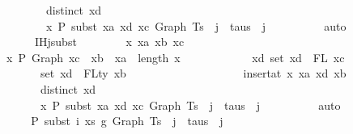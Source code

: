 \begin{isabellebody}
\ \ \ \ \ \ \ \ \ \ \ \ \ \ \ \ \ \ distinct\ xd\ {\isasymlongrightarrow}\isanewline
\ \ \ \ \ \ \ \ \ \ \ \ \ \ \ \ \ \ x\ {\isasymturnstile}{\isacharbraceleft}{\kern0pt}P{\isacharbraceright}{\kern0pt}\ subst\ xa\ xd\ xc\ {\isacharparenleft}{\kern0pt}Graph\ {\isacharparenleft}{\kern0pt}Ts\ {\isacharbang}{\kern0pt}\ j{\isacharparenright}{\kern0pt}{\isacharparenright}{\kern0pt}\ {\isacharcolon}{\kern0pt}\ taus\ {\isacharbang}{\kern0pt}\ j{\isacharparenright}{\kern0pt}{\isacharparenright}{\kern0pt}{\isachardoublequoteclose}\isanewline
\ \ \ \ \ \ \ \ \isamarkupfalse%
\ auto\isanewline
\isanewline
\ \ \ \ \ \ \isanewline
\ \ \ \ \ \ \isamarkupfalse%
\ \isamarkupfalse%
\ IHj{\isacharunderscore}{\kern0pt}subst{\isacharcolon}{\kern0pt}\isanewline
\ \ \ \ \ \ \ \ {\isachardoublequoteopen}{\isasymforall}x\ xa\ xb\ xc{\isachardot}{\kern0pt}\isanewline
\ \ \ \ \ \ \ \ \ \ \ x\ {\isasymturnstile}{\isacharbraceleft}{\kern0pt}P{\isacharbraceright}{\kern0pt}\ Graph\ xc\ {\isacharcolon}{\kern0pt}\ xb\ {\isasymlongrightarrow}\ xa\ {\isasymle}\ length\ x\ {\isasymlongrightarrow}\isanewline
\ \ \ \ \ \ \ \ \ \ \ {\isacharparenleft}{\kern0pt}{\isasymforall}xd{\isachardot}{\kern0pt}\ set\ xd\ {\isacharequal}{\kern0pt}\ FL\ xc\ {\isasymlongrightarrow}\isanewline
\ \ \ \ \ \ \ \ \ \ \ \ \ \ \ \ \ set\ xd\ {\isacharequal}{\kern0pt}\ FLty\ xb\ {\isasymlongrightarrow}\isanewline
\ \ \ \ \ \ \ \ \ \ \ \ \ \ \ \ \ {\isasymGamma}\ {\isacharequal}{\kern0pt}\ insert{\isacharunderscore}{\kern0pt}at\ x\ xa\ {\isacharparenleft}{\kern0pt}xd{\isacharcomma}{\kern0pt}\ xb{\isacharparenright}{\kern0pt}\ {\isasymlongrightarrow}\isanewline
\ \ \ \ \ \ \ \ \ \ \ \ \ \ \ \ \ distinct\ xd\ {\isasymlongrightarrow}\isanewline
\ \ \ \ \ \ \ \ \ \ \ \ \ \ \ \ \ x\ {\isasymturnstile}{\isacharbraceleft}{\kern0pt}P{\isacharbraceright}{\kern0pt}\ subst\ xa\ xd\ xc\ {\isacharparenleft}{\kern0pt}Graph\ {\isacharparenleft}{\kern0pt}Ts\ {\isacharbang}{\kern0pt}\ j{\isacharparenright}{\kern0pt}{\isacharparenright}{\kern0pt}\ {\isacharcolon}{\kern0pt}\ taus\ {\isacharbang}{\kern0pt}\ j{\isacharparenright}{\kern0pt}{\isachardoublequoteclose}\isanewline
\ \ \ \ \ \ \ \ \isamarkupfalse%
\ auto\isanewline
\isanewline
\ \ \ \ \ \ \isanewline
\ \ \ \ \ \ \isamarkupfalse%
\ {\isachardoublequoteopen}{\isasymGamma}{}\ {\isasymturnstile}{\isacharbraceleft}{\kern0pt}P{\isacharbraceright}{\kern0pt}\ subst\ i\ xs\ g{}\ {\isacharparenleft}{\kern0pt}Graph\ {\isacharparenleft}{\kern0pt}Ts\ {\isacharbang}{\kern0pt}\ j{\isacharparenright}{\kern0pt}{\isacharparenright}{\kern0pt}\ {\isacharcolon}{\kern0pt}\ taus\ {\isacharbang}{\kern0pt}\ j{\isachardoublequoteclose}\isanewline

\end{isabellebody}

